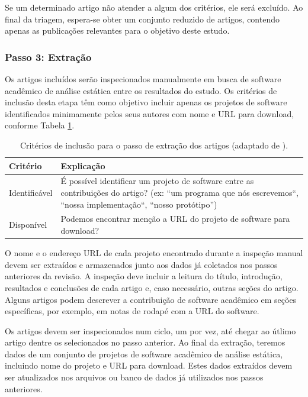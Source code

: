 Se um determinado artigo não atender a algum dos critérios, ele será
excluído. Ao final da triagem, espera-se obter um conjunto reduzido
de artigos, contendo apenas as publicações relevantes para o objetivo
deste estudo.

\subsubsection{Passo 3: Extração}

Os artigos incluídos serão inspecionados manualmente em busca de software acadêmico de
análise estática entre os resultados do estudo. Os critérios de inclusão desta etapa têm
como objetivo incluir apenas os projetos de software identificados minimamente
pelos seus autores com nome e URL para download, conforme Tabela
\ref{criterios-extracao}.

\begin{table}[h]
\caption{Critérios de inclusão para o passo de extração dos artigos (adaptado de ).}
\centering
\begin{tabular}{ l p{12cm} }
  \hline
  Critério         & Explicação \\
  \hline
  Identificável    & É possível identificar um projeto de software entre as contribuições do artigo? (ex: ``um programa que nós escrevemos``, ``nossa implementação``, ``nosso protótipo'') \\
  Disponível       & Podemos encontrar menção a URL do projeto de software para download? \\
  \hline
\end{tabular}
\label{criterios-extracao}
\end{table}

O nome e o endereço URL de cada projeto encontrado durante a inspeção manual
devem ser extraídos e armazenados junto aos dados já coletados nos passos
anteriores da revisão. A inspeção deve incluir a leitura do título, introdução,
resultados e conclusões de cada artigo e, caso necessário, outras
seções do artigo. Alguns artigos podem descrever a contribuição de software acadêmico
em seções específicas, por exemplo, em
notas de rodapé com a URL do software.

Os artigos devem ser inspecionados num ciclo, um por vez, até chegar ao útlimo
artigo dentre os selecionados no passo anterior. Ao final da extração, teremos
dados de um conjunto de projetos de software acadêmico de análise estática,
incluindo nome do projeto e URL para download. Estes dados extraídos devem ser
atualizados nos arquivos ou banco de dados já utilizados nos passos anteriores.

